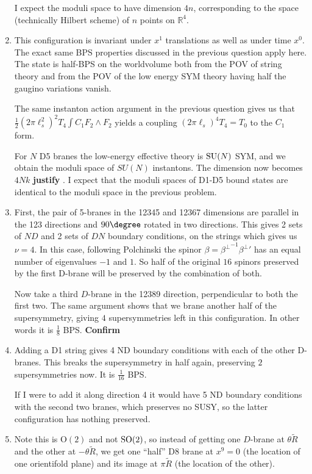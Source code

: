 \documentclass[11pt, class=article, crop=false]{standalone}
\begin{document}
\begin{enumerate}
	 I expect the moduli space to have dimension $4 n$, corresponding to the space (technically Hilbert scheme) of $n$ points on $\mathbb R^4$.
	
	\item This configuration is invariant under $x^1$ translations as well as under time $x^0$. The exact same BPS properties discussed in the previous question apply here. The state is half-BPS on the worldvolume both from the POV of string theory and from the POV of the low energy SYM theory having half the gaugino variations vanish. 
	
	The same instanton action argument in the previous question gives us that $\frac12 (2\pi \ell_s^2)^2 T_4 \int C_1 F_2 \wedge F_2$ yields a coupling $(2\pi \ell_s)^4 T_4 = T_0$ to the $C_1$ form.  
	
	For $N$ D5 branes the low-energy effective theory is $\mathrm{SU}(N)$ SYM, and we obtain the moduli space of $SU(N)$ instantons. The dimension now becomes $4 N k$ \textbf{justify} . I expect that the moduli spaces of D1-D5 bound states are identical to the moduli space in the previous problem. 
	
	\item First, the pair of 5-branes in the 12345 and 12367 dimensions are parallel in the 123 directions and $90\degree$ rotated in two directions. This gives 2 sets of $ND$ and 2 sets of $DN$ boundary conditions, on the strings which gives us $\nu = 4$. In this case, following Polchinski the spinor $\beta = {\beta^{\perp}}^{-1} {\beta^\perp}'$ has an equal number of eigenvalues $-1$ and $1$. So half of the original $16$ spinors preserved by the first D-brane will be preserved by the combination of both. 
	
	Now take a third $D$-brane in the 12389 direction, perpendicular to both the first two. The same argument shows that we brane another half of the supersymmetry, giving $4$ supersymmetries left in this configuration. In other words it is $\frac18$ BPS. \textbf{Confirm}
	
	\item Adding a D1 string gives 4 ND boundary conditions with each of the other D-branes. This breaks the supersymmetry in half again, preserving $2$ supersymmetries now. It is $\frac{1}{16}$ BPS. 
	
	If I were to add it along direction 4 it would have 5 ND boundary conditions with the second two branes, which preserves no SUSY, so the latter configuration has nothing preserved. 
	
	\item Note this is $\mathrm O(2)$ and not $\mathrm{SO}(2)$, so instead of getting one $D$-brane at $\theta \tilde R$ and the other at $-\theta \tilde R$, we get one ``half'' D8 brane at $x^9 = 0$ (the location of one orientifold plane) and its image at $\pi \tilde R$ (the location of the other).
	

\end{enumerate}
\end{document}
